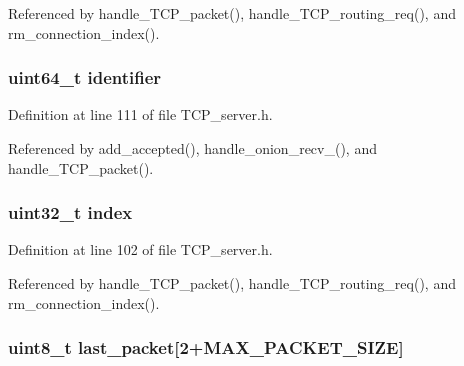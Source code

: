 Referenced by handle\+\_\+\+T\+C\+P\+\_\+packet(), handle\+\_\+\+T\+C\+P\+\_\+routing\+\_\+req(), and rm\+\_\+connection\+\_\+index().

\hypertarget{struct_t_c_p___secure___connection_ad1813f451cfaf8c9700e6329c5ea2f2b}{
\subsubsection[{identifier}]{\setlength{\rightskip}{0pt plus 5cm}uint64\+\_\+t identifier}}\label{struct_t_c_p___secure___connection_ad1813f451cfaf8c9700e6329c5ea2f2b}


Definition at line 111 of file T\+C\+P\+\_\+server.\+h.



Referenced by add\+\_\+accepted(), handle\+\_\+onion\+\_\+recv\+\_(), and handle\+\_\+\+T\+C\+P\+\_\+packet().

\hypertarget{struct_t_c_p___secure___connection_aafd95f8c7a99b9189ede7cdf0871ebe8}{
\subsubsection[{index}]{\setlength{\rightskip}{0pt plus 5cm}uint32\+\_\+t index}}\label{struct_t_c_p___secure___connection_aafd95f8c7a99b9189ede7cdf0871ebe8}


Definition at line 102 of file T\+C\+P\+\_\+server.\+h.



Referenced by handle\+\_\+\+T\+C\+P\+\_\+packet(), handle\+\_\+\+T\+C\+P\+\_\+routing\+\_\+req(), and rm\+\_\+connection\+\_\+index().

\hypertarget{struct_t_c_p___secure___connection_af7b6d103d243e4267b112f6efe1573e2}{
\subsubsection[{last\+\_\+packet}]{\setlength{\rightskip}{0pt plus 5cm}uint8\+\_\+t last\+\_\+packet\mbox{[}2+{\bf M\+A\+X\+\_\+\+P\+A\+C\+K\+E\+T\+\_\+\+S\+I\+Z\+E}\mbox{]}}}\label{struct_t_c_p___secure___connection_af7b6d103d243e4267b112f6efe1573e2}


